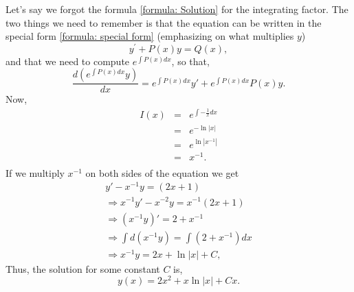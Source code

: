 \documentclass[11pt]{article}
\begin{document}
\begin{solution}
Let's say we forgot the formula \eqref{formula: Solution} for the integrating factor. The two things we need to remember is that the equation can be written in the special form \eqref{formula: special form} (emphasizing on what multiplies $y$)
\begin{equation*}
y^{\prime} + P(x) y = Q(x),
\end{equation*}
and that we need to compute $e^{\int P(x)dx}$, so that,
\begin{equation*}
     \frac{d(e^{\int P(x)dx} y)}{dx} = e^{\int P(x)dx} y' + e^{\int P(x)dx}P(x) y.
\end{equation*}
Now, 
\begin{eqnarray*}
I(x) & = & e^{\int - \frac{1 }{x} dx} \\
& = & e^{-\ln|x|} \\
& = & e^{\ln|x^{-1}|} \\
& = & x^{-1}. \\
\end{eqnarray*}
If we multiply $x^{-1}$ on both sides of the equation we get
\begin{gather*}
     y' - x^{-1}y = (2x +1)\\
     \Rightarrow x^{-1}y' - x^{-2}y = x^{-1}(2x +1)\\
     \Rightarrow (x^{-1}y)'=2 + x^{-1}\\
     \Rightarrow \int d(x^{-1}y) = \int (2 +x^{-1})dx\\
     \Rightarrow x^{-1} y = 2x +\ln |x| + C,
\end{gather*}
Thus, the solution for some constant $C$ is, 
\begin{equation*}
     \boxed{y(x) = 2 x^{2} +x\ln |x| +C x}.
\end{equation*}

\end{solution}
\end{document}
